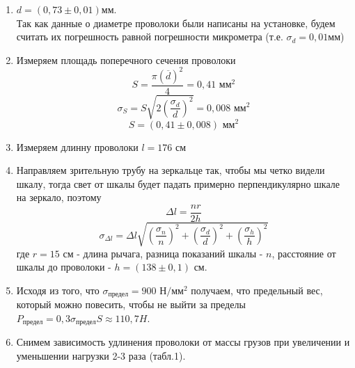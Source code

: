 \documentclass[a4paper, 10pt]{article}%
\begin{document}
\begin{enumerate}
\item $d = (0,73 \pm 0,01) \text{мм}$. \\
Так как данные о диаметре проволоки были написаны на установке, будем считать их погрешность равной погрешности микрометра (т.е. $\sigma_d = 0,01 \text{мм}$)
\item Измеряем площадь поперечного сечения проволоки
\[S =\dfrac{ \pi (\overline{d})^2}{4} = 0,41 \text{ мм}^2\]
\[\sigma_S = S\sqrt{2\left( \dfrac{\sigma_d}{d}\right) ^2} = 0,008 \text{ мм}^2\]
\[S = (0,41\pm0,008) \text{ мм}^2\]
\item Измеряем длинну проволоки $l = 176  \text{ см}$
\item Направляем зрительную трубу на зеркальце так, чтобы мы четко видели шкалу, тогда свет от шкалы будет падать примерно перпендикулярно шкале на зеркало, поэтому
\[\Delta l =\dfrac{nr}{2h}\]
\[ \sigma_{\Delta l} = \Delta l\sqrt{\left( \dfrac{\sigma_{n}}{n}\right)^2 + \left(\dfrac{\sigma_d}{d}\right)^2+\left(\dfrac{\sigma_h}{h}\right)^2} \]
где $r = 15$ см - длина рычага, разница показаний шкалы - $n$, расстояние от шкалы до проволоки - $h = (138\pm0,1)\text{ см}$.
\item Исходя из того, что $\sigma_{\text{предел}} = 900 \text{ Н}/\text{мм}^2$ получаем, что предельный вес, который можно повесить, чтобы не выйти за пределы $P_{\text{предел}} = 0,3 \sigma_{\text{предел}} S \approx 110,7 H$. 
\item Снимем зависимость удлинения проволоки от массы грузов при увеличении и уменьшении нагрузки 2-3 раза (табл.1). 
\begin{table}
\caption{Зависимость удлинения проволоки от нагрузки}


\end{table}
\end{enumerate}
\end{document}
